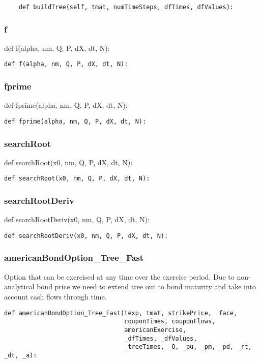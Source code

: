 \documentclass[twoside,11pt]{book}
\begin{document}
\begin{lstlisting}
    def buildTree(self, tmat, numTimeSteps, dfTimes, dfValues):
\end{lstlisting}

\subsubsection*{{\bf f}}
def f(alpha, nm, Q, P, dX, dt, N): 

\begin{lstlisting}
def f(alpha, nm, Q, P, dX, dt, N):
\end{lstlisting}

\subsubsection*{{\bf fprime}}
def fprime(alpha, nm, Q, P, dX, dt, N): 

\begin{lstlisting}
def fprime(alpha, nm, Q, P, dX, dt, N):
\end{lstlisting}

\subsubsection*{{\bf searchRoot}}
def searchRoot(x0, nm, Q, P, dX, dt, N): 

\begin{lstlisting}
def searchRoot(x0, nm, Q, P, dX, dt, N):
\end{lstlisting}

\subsubsection*{{\bf searchRootDeriv}}
def searchRootDeriv(x0, nm, Q, P, dX, dt, N): 

\begin{lstlisting}
def searchRootDeriv(x0, nm, Q, P, dX, dt, N):
\end{lstlisting}

\subsubsection*{{\bf americanBondOption\_Tree\_Fast}}
Option that can be exercised at any time over the exercise period. Due to non-analytical bond price we need to extend tree out to bond maturity and take into account cash flows through time.  

\begin{lstlisting}
def americanBondOption_Tree_Fast(texp, tmat, strikePrice,  face,
                                 couponTimes, couponFlows,
                                 americanExercise,
                                 _dfTimes, _dfValues,
                                 _treeTimes, _Q, _pu, _pm, _pd, _rt, _dt, _a):
\end{lstlisting}
\end{document}
